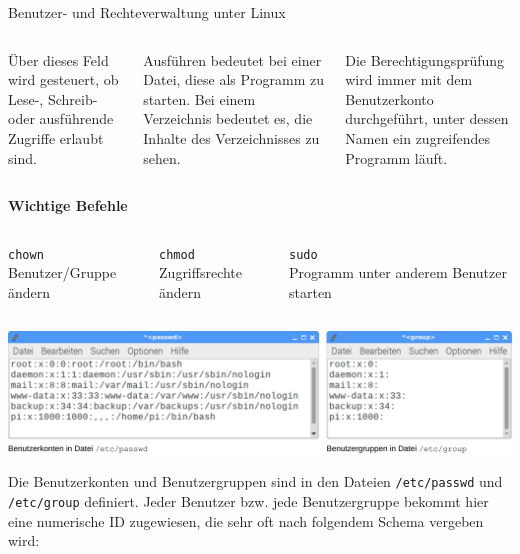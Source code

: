 {\begin{frame}[allowframebreaks]{Benutzer- und Rechteverwaltung unter Linux}
\begin{columns}[onlytextwidth]
{            Über dieses Feld wird gesteuert, ob Lese-, Schreib- oder ausführende
            Zugriffe erlaubt sind.

            \medskip

            \glqq{}Ausführen\grqq{} bedeutet bei einer Datei, diese als Programm
            zu starten. Bei einem Verzeichnis bedeutet es, die Inhalte des
            Verzeichnisses zu sehen.

            \medskip

            Die Berechtigungsprüfung wird immer mit dem Benutzerkonto durchgeführt,
            unter dessen Namen ein zugreifendes Programm läuft.
        }
    \end{columns}

    \medskip
    \textbf{Wichtige Befehle}

    \begin{columns}[onlytextwidth]
        \texttt{chown} \\ Benutzer/Gruppe ändern

        \texttt{chmod} \\ Zugriffsrechte ändern

        \texttt{sudo} \\ Programm unter anderem Benutzer starten
    \end{columns}

    \framebreak

    \begin{center}
        \includegraphics[width=\textwidth]{8-linux/img/rechte-konfiguration}
    \end{center}

    \parbox{\linewidth}{
        Die Benutzerkonten und Benutzergruppen sind in den Dateien
        \texttt{/etc/passwd} und \texttt{/etc/group} definiert. Jeder
        Benutzer bzw. jede Benutzergruppe bekommt hier eine numerische ID
        zugewiesen, die sehr oft nach folgendem Schema vergeben wird:
    }

    \medskip

    {
        \scriptsize
        \renewcommand{\arraystretch}{1.4}
        \setlength{\tabcolsep}{0em}

}
\end{frame}}
